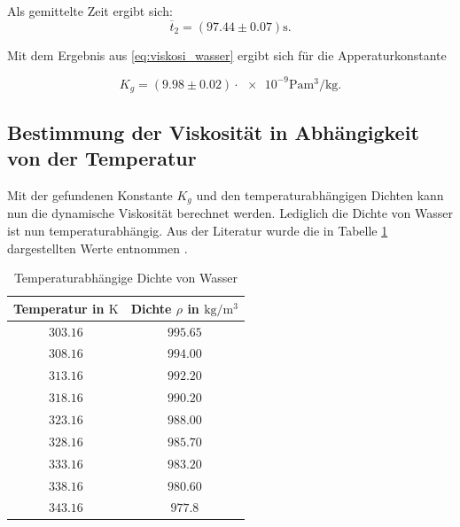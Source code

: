 Als gemittelte Zeit ergibt sich:
\begin{equation}
\label{eq:gemittelte_fallzeit_gross}
\overline{t}_{2}=\left(\num{97.44}\pm\num{0.07}\right) \si{\second}.
\end{equation}

Mit dem Ergebnis aus \eqref{eq:viskosi_wasser} ergibt sich für die
Apperaturkonstante

\begin{equation}
\label{eq:app_konst_gross}
K_{g}=\left(\num{9.98}\pm\num{0.02}\right)\cdot{\num{e-9}} \si{\pascal\cubic\meter\per\kilogram}.
\end{equation}

\subsection{Bestimmung der Viskosität in Abhängigkeit von der Temperatur}
Mit der gefundenen Konstante $K_{g}$ und den temperaturabhängigen Dichten kann nun die dynamische 
Viskosität berechnet werden. %
Lediglich die Dichte von Wasser ist nun temperaturabhängig.
Aus der Literatur wurde die in Tabelle \ref{tab:dichtewasser} dargestellten Werte
entnommen \cite{lit_dichte}.  %

\begin{table}
\centering
\begin{tabular} {cc}
  \toprule
  Temperatur in $\si{\kelvin}$ & Dichte $\rho$ in $\si{\kilogram\per\cubic\meter}$ \\
  \midrule
  $\num{303.16}$ &$\num{995.65}$ \\
  $\num{308.16}$ &$\num{994.00}$\\
  $\num{313.16}$ &$\num{992.20}$\\
  $\num{318.16}$ &$\num{990.20}$\\
  $\num{323.16}$ &$\num{988.00}$\\
  $\num{328.16}$ &$\num{985.70}$\\
  $\num{333.16}$ &$\num{983.20}$\\
  $\num{338.16}$ &$\num{980.60}$\\
  $\num{343.16}$ &$\num{977.8}$\\
\bottomrule
\end{tabular}
\caption{Temperaturabhängige Dichte von Wasser}
\label{tab:dichtewasser}
\end{table}

